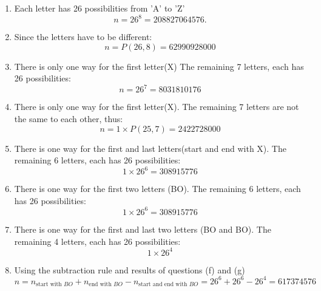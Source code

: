 \documentclass[a4paper]{article}
\begin{document}
	\begin{enumerate}[label = \textbf{\alph*)}]
	    \item Each letter has 26 possibilities from 'A' to 'Z'
	    \begin{equation*}
	        n = 26^{8} = 208827064576.
	    \end{equation*}
	    \item Since the letters have to be different:
	    \begin{equation*}
	        n = P(26,8) = 62990928000 
	    \end{equation*}
        \item There is only one way for the first letter(X) The remaining 7 letters, each has 26 possibilities: 
        \begin{equation*}
            n = 26^{7} = 8031810176
        \end{equation*}
        \item There is only one way for the first letter(X). The remaining 7 letters are not the same to each other, thus:
        \begin{equation*}
            n = 1 \times P(25,7) = 2422728000
        \end{equation*} 
        \item There is one way for the first and last letters(start and end with X). The remaining 6 letters, each has 26 possibilities:
        \begin{equation*}
            1 \times 26^{6} = 308915776
        \end{equation*}
        \item There is one way for the first two letters (BO). The remaining 6 letters, each has 26 possibilities:
        \begin{equation*}
            1 \times 26^{6} = 308915776
        \end{equation*}
        \item There is one way for the first and last two letters (BO and BO). The remaining 4 letters, each has 26 possibilities:
        \begin{equation*}
            1 \times 26^{4}
        \end{equation*}
        \item Using the subtraction rule and results of questions (f) and (g)
        \begin{equation*}
            n = n_{\text{start with }BO} + n_{\text{end with }BO} - n_{\text{start and end with }BO } = 26^{6} + 26^{6} - 26^{4} 
            = 617374576
        \end{equation*}
	\end{enumerate}
\end{document}
